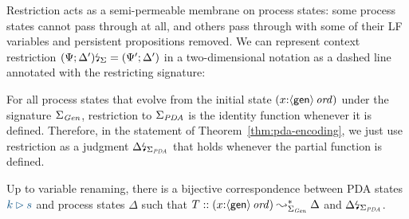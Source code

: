 Restriction acts as a semi-permeable membrane on process states: some
process states cannot pass through at all, and others pass through
with some of their LF variables and persistent propositions
removed. We can represent context restriction ${(\Psi;
  \Delta')}{\mbox{\lightning}}_{\Sigma} = (\Psi'; \Delta')$ in a two-dimensional notation
as a dashed line annotated with the restricting signature:
\begin{center}
\end{center}

For all process states that evolve from the initial state
$(x{:}{\langle {\sf gen} \rangle}\,{{\it ord}})$ under the signature $\Sigma_{\it
  Gen}$, restriction to $\Sigma_{\it PDA}$ is the identity function
whenever it is defined. Therefore, in the statement of
Theorem~\ref{thm:pda-encoding}, we just use restriction as a judgment
${\Delta}{\mbox{\lightning}}_{\Sigma_{\it PDA}}$ that holds whenever the partial function is defined.

\bigskip
\begin{theorem}[Encoding]\label{thm:pda-encoding}
  Up to variable renaming, there is a bijective correspondence between
  PDA states $\obj{k \rhd s}$ and process states $\Delta$ such that
  $T :: (x{:}{\langle {\sf gen} \rangle}\,{{\it ord}}) \leadsto^*_{\Sigma_{\it Gen}}
  \Delta$ and ${\Delta}{\mbox{\lightning}}_{\Sigma_{\it
      PDA}}$.
\end{theorem}

